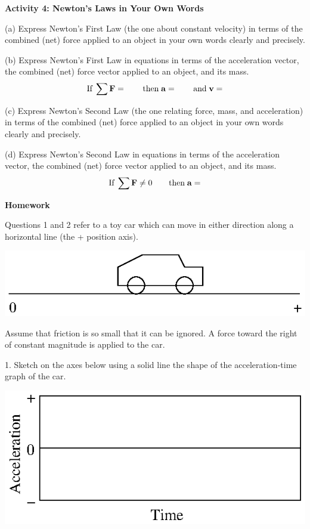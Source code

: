 \textbf{Activity 4: Newton's Laws in Your Own Words} 

(a) Express Newton's First Law (the one about constant velocity) in terms of
the combined (net) force applied to an object in your own words clearly and
precisely.
\vspace{20mm}

(b) Express Newton's First Law in equations in terms of the acceleration vector,
the combined (net) force vector applied to an object, and its mass.
\[
\mbox{If}\; \sum {\bf F}= \qquad \mbox{then}\; {\bf a}=
\qquad \mbox{and}\; {\bf v}=\]


(c) Express Newton's Second Law (the one relating force, mass, and acceleration)
in terms of the combined (net) force applied to an object in your own words
clearly and precisely.
\vspace{20mm}

(d) Express Newton's Second Law in equations in terms of the acceleration vector,
the combined (net) force vector applied to an object, and its mass.
\[
\mbox{If}\; \sum {\bf F}\neq 0\qquad \mbox{then}\; 
{\bf a}=\]


\textbf{Homework} 

Questions 1 and 2 refer to a toy car which can move in either direction along
a horizontal line (the + position axis).

\vspace{0.3cm}
{\par\centering \includegraphics{force2/force2_fig6.eps} \par}
\vspace{0.3cm}

Assume that friction is so small that it can be ignored. A force toward the
right of constant magnitude is applied to the car. 

1. Sketch on the axes below using a solid line the shape of the acceleration-time
graph of the car.

\vspace{0.3cm}
{\par\centering \includegraphics{force_mass/force_mass_fig1.eps} \par}
\vspace{0.3cm}

